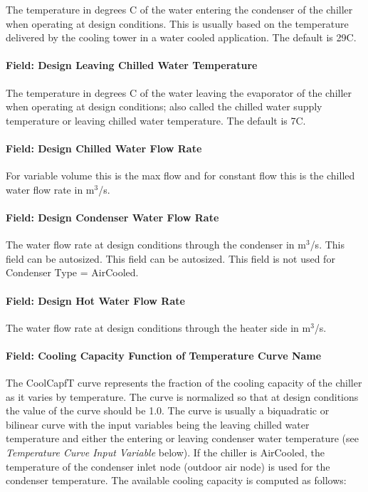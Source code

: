 The temperature in degrees C of the water entering the condenser of the chiller when operating at design conditions. This is usually based on the temperature delivered by the cooling tower in a water cooled application. The default is 29C.

\paragraph{Field: Design Leaving Chilled Water Temperature}\label{field-design-leaving-chilled-water-temperature}

The temperature in degrees C of the water leaving the evaporator of the chiller when operating at design conditions; also called the chilled water supply temperature or leaving chilled water temperature. The default is 7C.

\paragraph{Field: Design Chilled Water Flow Rate}\label{field-design-chilled-water-flow-rate-6}

For variable volume this is the max flow and for constant flow this is the chilled water flow rate in m\(^{3}\)/s.

\paragraph{Field: Design Condenser Water Flow Rate}\label{field-design-condenser-water-flow-rate-5}

The water flow rate at design conditions through the condenser in m\(^{3}\)/s. This field can be autosized. This field can be autosized. This field is not used for Condenser Type = AirCooled.

\paragraph{Field: Design Hot Water Flow Rate}\label{field-design-hot-water-flow-rate}

The water flow rate at design conditions through the heater side in m\(^{3}\)/s.

\paragraph{Field: Cooling Capacity Function of Temperature Curve Name}\label{field-cooling-capacity-function-of-temperature-curve-name-2}

The CoolCapfT curve represents the fraction of the cooling capacity of the chiller as it varies by temperature. The curve is normalized so that at design conditions the value of the curve should be 1.0. The curve is usually a biquadratic or bilinear curve with the input variables being the leaving chilled water temperature and either the entering or leaving condenser water temperature (see \emph{Temperature Curve Input Variable} below). If the chiller is AirCooled, the temperature of the condenser inlet node (outdoor air node) is used for the condenser temperature. The available cooling capacity is computed as follows:

